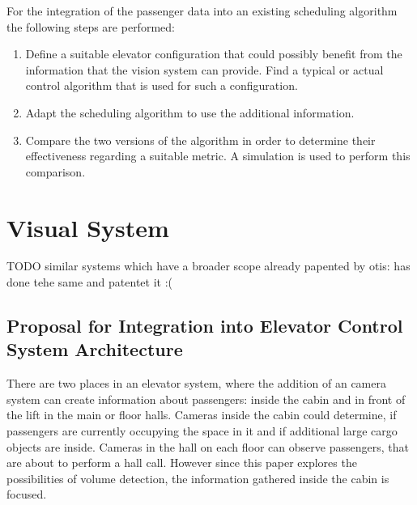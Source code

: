 For the integration of the passenger data into an existing scheduling algorithm the following steps are performed:

\begin{enumerate}
    \item Define a suitable elevator configuration that could possibly benefit from the information that the vision system can provide. 
    Find a typical or actual control algorithm that is used for such a configuration.
    \item Adapt the scheduling algorithm to use the additional information.
    \item Compare the two versions of the algorithm in order to determine their effectiveness regarding a suitable metric.
    A simulation is used to perform this comparison.
\end{enumerate}

 
\section{Visual System}
TODO
similar systems which have a broader scope already papented by otis:
\autocite{lin2011control}
\autocite[][]{xang2016trafficlist} has done tehe same and patentet it :(

\subsection{Proposal for Integration into Elevator Control System Architecture}

There are two places in an elevator system, where the addition of an camera system can create information about passengers: inside the cabin and in front of the lift in the main or floor halls.
Cameras inside the cabin could determine, if passengers are currently occupying the space in it and if additional large cargo objects are inside.
Cameras in the hall on each floor can observe passengers, that are about to perform a hall call.
However since this paper explores the possibilities of volume detection, 
the information gathered inside the cabin is focused.


